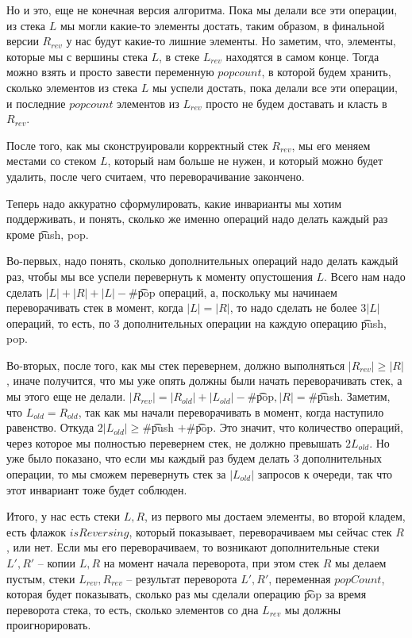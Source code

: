 Но и это, еще не конечная версия алгоритма. Пока мы делали все эти операции, из стека $L$ мы могли какие-то элементы достать,
таким образом, в финальной версии $R_{rev}$ у нас будут какие-то лишние элементы. 
Но заметим, что, элементы, которые мы с вершины стека $L$, в стеке $L_{rev}$ находятся в самом конце.
Тогда можно взять и просто завести переменную $popcount$, в которой будем хранить, сколько элементов из стека $L$ мы успели достать, пока делали
все эти операции, и последние $popcount$ элементов из $L_{rev}$ просто не будем доставать и класть в $R_{rev}$.

После того, как мы сконструировали корректный стек $R_{rev}$, мы его меняем местами со стеком $L$, который нам больше не нужен, и который можно будет
удалить, после чего считаем, что переворачивание закончено.

Теперь надо аккуратно сформулировать, какие инварианты мы хотим поддерживать, и понять, сколько же именно операций надо делать каждый раз кроме
\t{push, pop}.
                
Во-первых, надо понять, сколько дополнительных операций надо делать каждый раз, чтобы мы все успели перевернуть к моменту опустошения $L$.
Всего нам надо сделать $|L| + |R| + |L| - \#$\t{pop} операций, а, поскольку мы начинаем переворачивать стек в момент, когда $|L| = |R|$, то
надо сделать не более $3|L|$ операций, то есть, по 3 дополнительных операции на каждую операцию \t{push, pop}.

Во-вторых, после того, как мы стек перевернем, должно выполняться $|R_{rev}| \ge |R|$, иначе получится, что мы уже опять должны были начать переворачивать
стек, а мы этого еще не делали.
$|R_{rev}| = |R_{old}| + |L_{old}| - \#$\t{pop}$, |R| = \#$\t{push}. 
Заметим, что $L_{old} = R_{old}$, так как мы начали переворачивать в момент, когда наступило равенство.
Откуда $2|L_{old}| \ge \#$\t{push} $+ \#$\t{pop}.
Это значит, что количество операций, через которое мы полностью перевернем стек, не должно превышать $2L_{old}$. 
Но уже было показано, что если мы каждый раз будем делать 3 дополнительных операции, то мы сможем перевернуть
стек за $|L_{old}|$ запросов к очереди, так что этот инвариант тоже будет соблюден.

Итого, у нас есть стеки $L, R$, из первого мы достаем элементы, во второй кладем, есть флажок $isReversing$, который показывает, переворачиваем мы сейчас
стек $R$, или нет.
Если мы его переворачиваем, то возникают дополнительные стеки $L', R'$ -- копии $L, R$ на момент начала переворота, при этом стек $R$ мы делаем пустым,
стеки $L_{rev}, R_{rev}$ -- результат переворота $L', R'$, переменная $popCount$, которая будет показывать, сколько раз мы сделали операцию \t{pop} за время 
переворота стека, то есть, сколько элементов со дна $L_{rev}$ мы должны проигнорировать.


